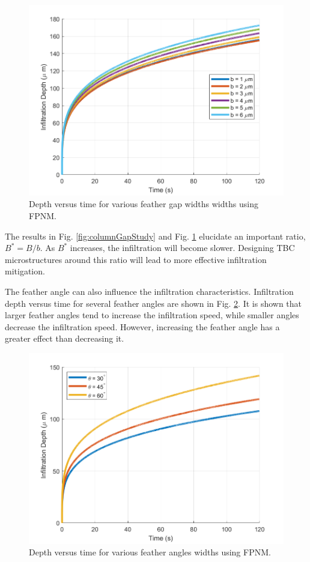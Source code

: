 \documentclass[%
 aip,
 amsmath,amssymb,
 reprint,%
]{revtex4-1}
\begin{document}
\begin{figure}[htp!]
    \centering
    \includegraphics[width=\linewidth]{Figures/featherGapStudy.png}
    \caption{Depth versus time for various feather gap widths widths using FPNM.}
    \label{fig:featherGapStudy}
\end{figure}

The results in Fig. \ref{fig:columnGapStudy} and Fig. \ref{fig:featherGapStudy} elucidate an important ratio,  $B^{*} = B/b$. As $B^{*}$ increases, the infiltration will become slower. Designing TBC microstructures around this ratio will lead to more effective infiltration mitigation.

The feather angle can also influence the infiltration characteristics. Infiltration depth versus time for several feather angles are shown in Fig. \ref{fig:angleStudy}. It is shown that larger feather angles tend to increase the infiltration speed, while smaller angles decrease the infiltration speed. However, increasing the feather angle has a greater effect than decreasing it.

\begin{figure}[htp!]
    \centering
    \includegraphics[width=\linewidth]{Figures/featherAngleStudy.png}
    \caption{Depth versus time for various feather angles widths using FPNM.}
    \label{fig:angleStudy}
\end{figure}
\end{document}
